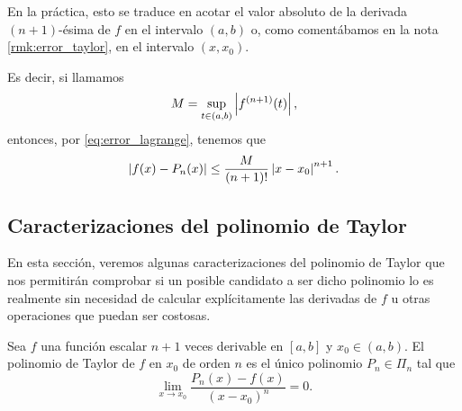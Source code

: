       En la práctica, esto se traduce en acotar el valor absoluto de la
      derivada $(n+1)$-ésima de $f$ en el intervalo $(a, b)$ o, como
      comentábamos en la nota \ref{rmk:error_taylor}, en el intervalo $(x,
      x_0)$.
      
      Es decir, si llamamos
      \[
        M = \sup_{t \in (a, b)} \left|f^{(n+1)}(t)\right|,
      \]
      entonces, por \ref{eq:error_lagrange}, tenemos que
      \[
        \left|f(x) - P_n(x)\right|
        \le \frac{M}{(n+1)!} \left|x - x_0\right|^{n+1}.
      \]

  \subsection{Caracterizaciones del polinomio de Taylor}
    En esta sección, veremos algunas caracterizaciones del polinomio de
    Taylor que nos permitirán comprobar si un posible candidato a ser dicho
    polinomio lo es realmente sin necesidad de calcular explícitamente las
    derivadas de $f$ u otras operaciones que puedan ser costosas.

    \begin{proposition} \label{prop:caracterizacion1_taylor}
      Sea $f$ una función escalar $n + 1$ veces derivable en $[a, b]$ y
      $x_0 \in (a, b)$. El polinomio de Taylor de $f$ en $x_0$ de orden $n$
      es el único polinomio $P_n \in \Pi_n$ tal que
      \begin{equation} \label{eq:caracterizacion1_taylor}
        \lim_{x \to x_0} \frac{P_n(x) - f(x)}{(x - x_0)^n} = 0.
      \end{equation}
    \end{proposition}

